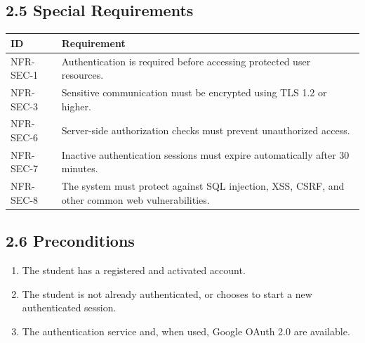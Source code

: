 \documentclass[12pt]{article}
\renewcommand{\baselinestretch}{1.5}
\begin{document}
\subsection*{2.5 Special Requirements}
\par\medskip
\begingroup
\small
\renewcommand{\baselinestretch}{1.0}\selectfont
\renewcommand{\arraystretch}{1.15}
\setlength{\tabcolsep}{6pt}
\begin{longtable}{|>{\raggedright\arraybackslash}p{}|>{\raggedright\arraybackslash}p{}|}
\hline
\textbf{ID} & \textbf{Requirement} \\ \hline
\endhead
NFR-SEC-1 & Authentication is required before accessing protected user resources. \\ \hline
NFR-SEC-3 & Sensitive communication must be encrypted using TLS 1.2 or higher. \\ \hline
NFR-SEC-6 & Server-side authorization checks must prevent unauthorized access. \\ \hline
NFR-SEC-7 & Inactive authentication sessions must expire automatically after 30 minutes. \\ \hline
NFR-SEC-8 & The system must protect against SQL injection, XSS, CSRF, and other common web vulnerabilities. \\ \hline
\end{longtable}
\endgroup
\par\medskip
\hypertarget{sec:2-6-preconditions}{}
\subsection*{2.6 Preconditions}
\par\medskip
\begin{enumerate}
\item The student has a registered and activated account.
\item The student is not already authenticated, or chooses to start a new authenticated session.
\item The authentication service and, when used, Google OAuth 2.0 are available.
\end{enumerate}
\par\medskip
\hypertarget{sec:2-7-postconditions}{}
\end{document}

